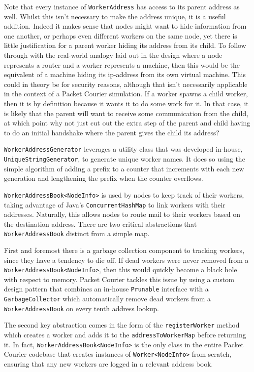 Note that every instance of \texttt{WorkerAddress} has access to its parent address as well. Whilst this isn't
necessary to make the address unique, it is a useful addition. Indeed it makes sense that nodes might want to hide
information from one another, or perhaps even different workers on the same node, yet there is little justification
for a parent worker hiding its address from its child. To follow through with the real-world analogy laid out in the
design where a node represents a router and a worker represents a machine, then this would be the equivalent of a
machine hiding its ip-address from its own virtual machine. This could in theory be for security reasons, although
that isn't necessarily applicable in the context of a Packet Courier simulation. If a worker spawns a child worker,
then it is by definition because it wants it to do some work for it. In that case, it is likely that the parent will
want to receive some communication from the child, at which point why not just cut out the extra step of the parent
and child having to do an initial handshake where the parent gives the child its address?

\texttt{WorkerAddressGenerator} leverages a utility class that was developed in-house, \texttt{UniqueStringGenerator},
to generate unique worker names. It does so using the simple algorithm of adding a prefix to a counter that
increments with each new generation and lengthening the prefix when the counter overflows.

\texttt{WorkerAddressBook<NodeInfo>} is used by nodes to keep track of their workers, taking advantage of Java's
\texttt{ConcurrentHashMap}\cite{java_ConcurrentHashMap} to link workers with their addresses. Naturally, this allows
nodes to route mail to their workers based on the destination address. There are two critical abstractions that
\texttt{WorkerAddressBook} distinct from a simple map.

First and foremost there is a garbage collection component to tracking workers, since they have a tendency to die
off. If dead workers were never removed from a \texttt{WorkerAddressBook<NodeInfo>}, then this would quickly become a
black hole with respect to memory. Packet Courier tackles this issue by using a custom design pattern that combines
an in-house \texttt{Prunable} interface with a \texttt{GarbageCollector} which automatically remove dead workers from a
\texttt{WorkerAddressBook} on every tenth address lookup.

The second key abstraction comes in the form of the \texttt{registerWorker} method which creates a worker and adds it
to the \texttt{addressToWorkerMap} before returning it. In fact, \texttt{WorkerAddressBook<NodeInfo>} is the only
class in the entire Packet Courier codebase that creates instances of \texttt{Worker<NodeInfo>} from scratch,
ensuring that any new workers are logged in a relevant address book.

